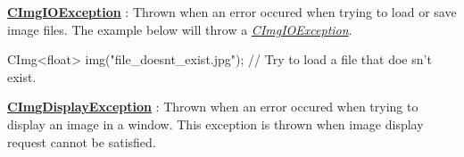 \begin{DoxyItemize}
\item {\bfseries \hyperlink{structcimg__library_1_1_c_img_i_o_exception}{CImgIOException}} : Thrown when an error occured when trying to load or save image files. The example below will throw a {\itshape \hyperlink{structcimg__library_1_1_c_img_i_o_exception}{CImgIOException}\/}. 
\begin{DoxyCode}
      CImg<float> img("file_doesnt_exist.jpg");    // Try to load a file that doe
      sn't exist.
\end{DoxyCode}

\end{DoxyItemize}


\begin{DoxyItemize}
\item {\bfseries \hyperlink{structcimg__library_1_1_c_img_display_exception}{CImgDisplayException}} : Thrown when an error occured when trying to display an image in a window. This exception is thrown when image display request cannot be satisfied.
\end{DoxyItemize}

